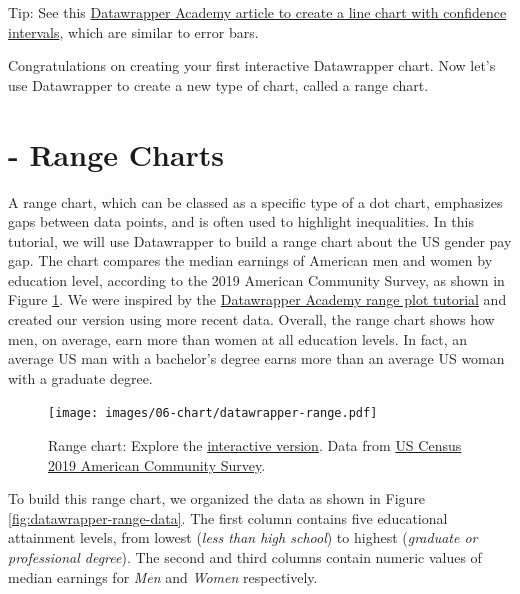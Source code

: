 \documentclass[
  english,
]{book}
\begin{document}
Tip: See this \href{https://academy.datawrapper.de/article/205-how-to-show-confidence-intervals-in-datawrapper-line-charts}{Datawrapper Academy article to create a line chart with confidence intervals}, which are similar to error bars.

Congratulations on creating your first interactive Datawrapper chart. Now let's use Datawrapper to create a new type of chart, called a range chart.

\hypertarget{range-datawrapper}{%
\section*{- Range Charts}\label{range-datawrapper}}

A range chart, which can be classed as a specific type of a dot chart, emphasizes gaps between data points, and is often used to highlight inequalities. In this tutorial, we will use Datawrapper to build a range chart about the US gender pay gap. The chart compares the median earnings of American men and women by education level, according to the 2019 American Community Survey, as shown in Figure \ref{fig:datawrapper-range}. We were inspired by the \href{https://academy.datawrapper.de/article/111-how-to-create-a-range-plot}{Datawrapper Academy range plot tutorial} and created our version using more recent data. Overall, the range chart shows how men, on average, earn more than women at all education levels. In fact, an average US man with a bachelor's degree earns more than an average US woman with a graduate degree.



\begin{figure}
\centering
\texttt{[image: images/06-chart/datawrapper-range.pdf]}
\caption{\label{fig:datawrapper-range}Range chart: Explore the \href{https://datawrapper.dwcdn.net/lVGnz/}{interactive version}. Data from \href{https://docs.google.com/spreadsheets/d/1qAfMHBegOz1-ZlN9UurZ_wsesmLGYlu_ch7M3Anwdsg/edit\#gid=0}{US Census 2019 American Community Survey}.}
\end{figure}

To build this range chart, we organized the data as shown in Figure \ref{fig:datawrapper-range-data}. The first column contains five educational attainment levels, from lowest (\emph{less than high school}) to highest (\emph{graduate or professional degree}). The second and third columns contain numeric values of median earnings for \emph{Men} and \emph{Women} respectively.
\end{document}
